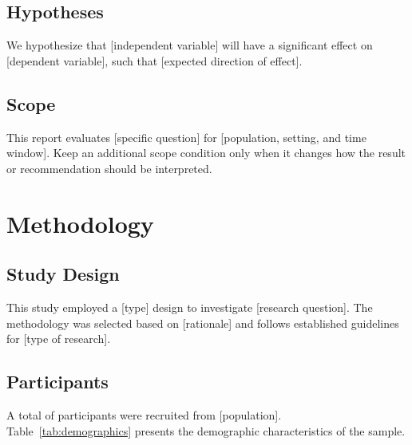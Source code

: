 \documentclass[11pt,letterpaper]{report}
\begin{document}
\section{Hypotheses}

\begin{hypothesis}
We hypothesize that [independent variable] will have a significant effect on [dependent variable], such that [expected direction of effect].
\end{hypothesis}

\section{Scope}

This report evaluates [specific question] for [population, setting, and time
window]. Keep an additional scope condition only when it changes how the result
or recommendation should be interpreted.


\chapter{Methodology}

\section{Study Design}

\begin{methodology}
This study employed a [type] design to investigate [research question]. The methodology was selected based on [rationale] and follows established guidelines for [type of research].
\end{methodology}

\section{Participants}

A total of  participants were recruited from [population]. Table~\ref{tab:demographics} presents the demographic characteristics of the sample.
\end{document}
